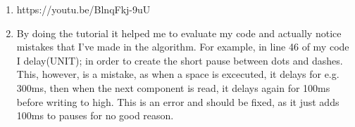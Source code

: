 \documentclass{article}
\begin{document}
\begin{enumerate}
  \item https://youtu.be/BlnqFkj-9uU
  \item By doing the tutorial it helped me to evaluate my code
    and actually notice mistakes that I've made in the algorithm.
    For example, in line 46 of my code I delay(UNIT); in order to
    create the short pause between dots and dashes.
    This, however, is a mistake, as when a space is excecuted,
    it delays for e.g. 300ms, then when the next component is read,
    it delays again for 100ms before writing to high.
    This is an error and should be fixed, as it just adds
    100ms to pauses for no good reason.
\end{enumerate}
\end{document}

